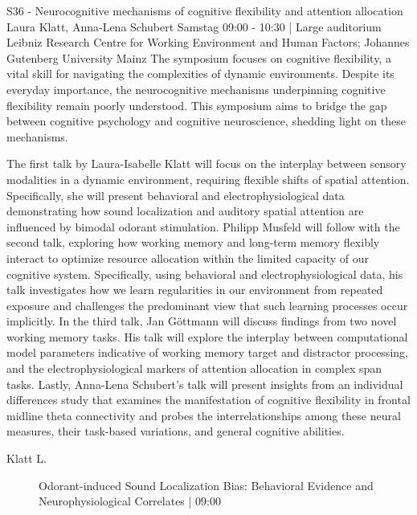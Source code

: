 
            \begin{symposium}
            {S36 - Neurocognitive mechanisms of cognitive flexibility and attention allocation }
            {Laura Klatt, Anna-Lena Schubert}
            {Samstag 09:00 - 10:30 | Large auditorium}
            {Leibniz Research Centre for Working Environment and Human Factors; Johannes Gutenberg University Mainz}
            The symposium focuses on cognitive flexibility, a vital skill for navigating the complexities of dynamic environments. Despite its everyday importance, the neurocognitive mechanisms underpinning cognitive flexibility remain poorly understood. This symposium aims to bridge the gap between cognitive psychology and cognitive neuroscience, shedding light on these mechanisms.

The first talk by Laura-Isabelle Klatt will focus on the interplay between sensory modalities in a dynamic environment, requiring flexible shifts of spatial attention. Specifically, she will present behavioral and electrophysiological data demonstrating how sound localization and auditory spatial attention are influenced by bimodal odorant stimulation. Philipp Musfeld will follow with the second talk, exploring how working memory and long-term memory flexibly interact to optimize resource allocation within the limited capacity of our cognitive system. Specifically, using behavioral and electrophysiological data, his talk investigates how we learn regularities in our environment from repeated exposure and challenges the predominant view that such learning processes occur implicitly. In the third talk, Jan Göttmann will discuss findings from two novel working memory tasks. His talk will explore the interplay between computational model parameters indicative of working memory target and distractor processing, and the electrophysiological markers of attention allocation in complex span tasks. Lastly, Anna-Lena Schubert's talk will present insights from an individual differences study that examines the manifestation of cognitive flexibility in frontal midline theta connectivity and probes the interrelationships among these neural measures, their task-based variations, and general cognitive abilities.
            \begin{description}    
            
                \item [ Klatt L.] Odorant-induced Sound Localization Bias: Behavioral Evidence and Neurophysiological Correlates \textcolor{mygray}{ | 09:00}    
                

\end{description}
\end{symposium}

